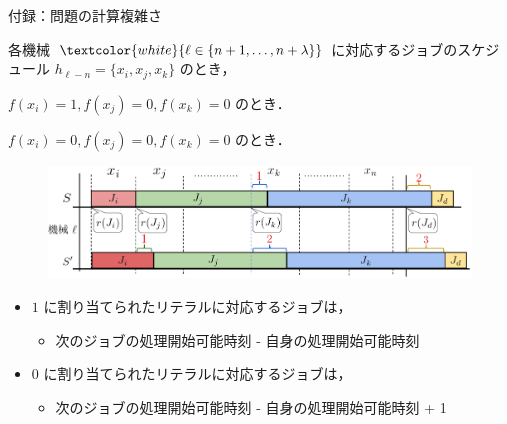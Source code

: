 \documentclass[dvipdfmx]{beamer}
\begin{document}
    \begin{frame}{付録：問題の計算複雑さ}
      \begin{block}{各機械 ${\textcolor{white}{\ell \in \{n + 1,\ldots,n + \lambda\}}}$ に対応するジョブのスケジュール}
        $h_{\ell - n} = \{x_i, x_j, x_k\}$ のとき，
        \begin{description}
          \setlength{\leftskip}{-12mm}
          \item[$S$：]
          $f(x_i) = 1, f(x_j) = 0, f(x_k) = 0$ のとき．
          \item[$S'$：]
          $f(x_i) = 0, f(x_j) = 0, f(x_k) = 0$ のとき．
        \end{description}
        \vspace{-5mm}
        \begin{figure}[h]
          \centering
          \includegraphics[width=12cm]{figure/3SAT6.pdf}
        \end{figure}
      \end{block}
      \begin{itemize}
        \item $1$ に割り当てられたリテラルに対応するジョブは，
        \begin{itemize}
          \item 次のジョブの処理開始可能時刻 - 自身の処理開始可能時刻
        \end{itemize}
        \item $0$ に割り当てられたリテラルに対応するジョブは，
        \begin{itemize}
          \item 次のジョブの処理開始可能時刻 - 自身の処理開始可能時刻 + 1
        \end{itemize}
      \end{itemize}
    \end{frame}
\end{document}
